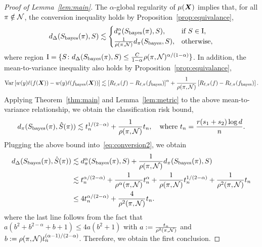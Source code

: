 \documentclass[11pt]{article}
\theoremstyle{plain}
\theoremstyle{definition}
\def\bayesf{f_{\textup{bayes}}}
\def\bayesS{S_{\textup{bayes}}}
\begin{document}
\begin{proof}[Proof of Lemma~\ref{lem:main}] The $\alpha$-global regularity of $\mu(\bm X)$ implies that, for all $\pi \notin \mathcal{N}$, the conversion inequality holds by Proposition~\ref{prop:equivalance},
\begin{equation}\label{eq:conversion2}
d_{\Delta}(\bayesS(\pi),S) \lesssim
\begin{cases}
d^\alpha_{\pi}(\bayesS(\pi),S), & \text{if }S\in \textup{I},\\
{1\over \rho(\pi, \tN)}d_{\pi}(\bayesS,S),& \text{otherwise},
\end{cases}
\end{equation}
where region  $\textup{I}=\{S \colon d_{\Delta}(\bayesS(\pi),S)\leq \frac	{C}{1-\alpha}\rho(\pi,\tN)^{\alpha/(1-\alpha)}\}$.
In addition,  the mean-to-variance inequality also holds by Proposition~\ref{prop:equivalance},
\begin{equation}
\text{Var}\left[w(y)\ell(f(\mX)) - w(y)\ell(\bayesf(\mX))\right] \lesssim \left[R_{\ell,\pi}(f)-R_{\ell,\pi}(\bayesf)\right]^{\alpha}+ {1\over \rho(\pi, \tN)}\left[R_{\ell,\pi}(f)-R_{\ell,\pi}(\bayesf)\right].
\end{equation}
Applying Theorem~\ref{thm:main} and Lemma~\ref{lem:metric} to the above mean-to-variance relationship, we obtain the classification risk bound,
\begin{align}
d_\pi(\bayesS(\pi), \hat S(\pi))\lesssim t_n^{1/(2-\alpha)}+ {1\over \rho(\pi, \tN)}t_n,\quad \text{where}\ t_n={r(s_1+s_2)\log d  \over n}.
\end{align}
Plugging the above bound into~\eqref{eq:conversion2}, we obtain
\begin{align}
d_{\Delta}(\bayesS(\pi),\hat S(\pi)) &\lesssim d^\alpha_{\pi}(\bayesS(\pi),S)+{1\over \rho(\pi, \tN)}d_{\pi}(\bayesS(\pi),S)\\
&\lesssim t_n^{\alpha/(2-\alpha)}+{1\over \rho^{\alpha}(\pi, \tN)}t_n^{\alpha}+{1\over \rho(\pi, \tN)}t_n^{1/(2-\alpha)}+{1\over \rho^2(\pi, \tN)}t_n\\
&\leq 4t_n^{\alpha/(2-\alpha)}+{4\over \rho^2(\pi, \tN)}t_n.
\end{align}
where the last line follows from the fact that $a(b^2+b^{2-\alpha}+b+1) \leq 4 a (b^2+1)$ with $a:={t_n \over \rho^2(\pi, \mathcal{N})}$ and $b:=\rho(\pi, \mathcal{N}) t_n^{(\alpha-1)/(2-\alpha)}$.  Therefore,  we obtain the first conclusion.



\end{proof}
\end{document}
